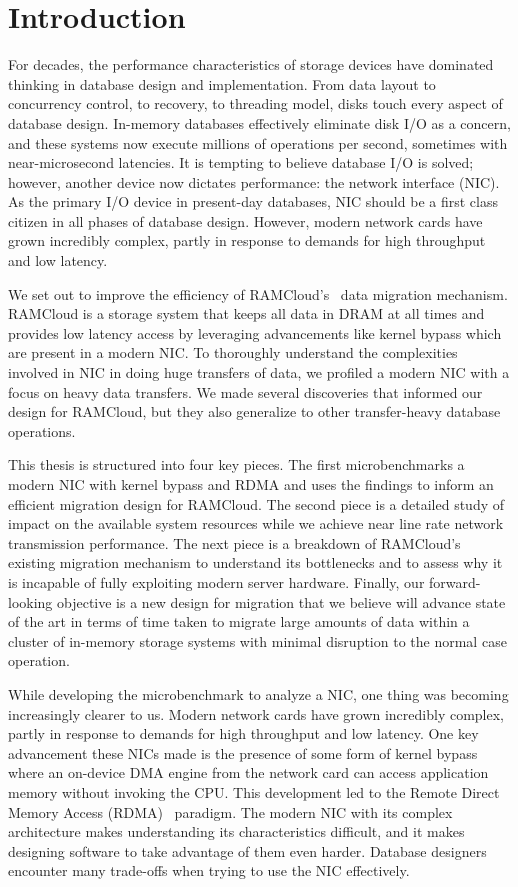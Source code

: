 
\chapter{Introduction}
\label{chap:intro}
For decades, the performance characteristics of storage devices have dominated
 thinking in database design and implementation. From data layout to
concurrency control, to recovery, to threading model, disks touch every aspect
of database design. In-memory databases effectively eliminate disk I/O as a
concern, and these systems now execute millions of operations per second,
sometimes with near-microsecond latencies.  It is tempting to believe 
database I/O is solved; however, another device now dictates
performance: the network interface (NIC). As the primary I/O device in present-day databases,
NIC should be a first class citizen in all phases of database design.
However, modern network cards have grown incredibly complex, partly in response
to demands for high throughput and low latency.

We set out to improve the efficiency of RAMCloud's~\cite{ramcloud} data migration mechanism. 
RAMCloud is a storage system that keeps all data in DRAM at all times and provides low latency access by
leveraging advancements like kernel bypass which are present in a modern NIC.
To thoroughly understand the complexities involved in NIC in doing huge
transfers of data, we profiled a modern NIC with a focus on heavy data transfers.
 We made several discoveries that informed our design for RAMCloud,
 but they also generalize to other transfer-heavy database operations. 

This thesis is structured into four key pieces. The first microbenchmarks a modern NIC 
with kernel bypass and RDMA and uses the findings to inform an efficient migration design for RAMCloud.
The second piece is a detailed study of impact on the available system resources while we achieve 
near line rate network transmission performance. 
The next piece is a breakdown of RAMCloud’s existing migration mechanism to understand its bottlenecks
and to assess why it is incapable of fully exploiting modern server hardware. 
Finally, our forward-looking objective is a new design for migration that we believe will advance state of the art
in terms of time taken to migrate large amounts of data within a cluster of in-memory storage systems
with minimal disruption to the normal case operation.

While developing the microbenchmark to analyze a NIC, one thing was becoming increasingly clearer to us.
Modern network cards have grown incredibly complex, partly in response to
demands for high throughput and low latency. One key advancement these NICs made 
is the presence of some form of kernel bypass where an on-device DMA engine from the network card 
can access application memory without invoking the CPU. This development led to the Remote 
Direct Memory Access (RDMA)~\cite{rdmapatent} paradigm. The modern NIC with its complex architecture
makes understanding its characteristics difficult, and it makes designing software to take advantage
of them even harder. Database designers encounter many trade-offs when trying to use the NIC effectively.

